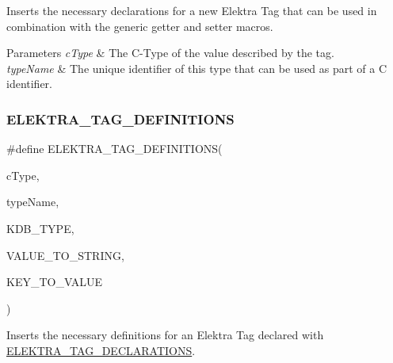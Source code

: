 Inserts the necessary declarations for a new Elektra Tag that can be used in combination with the generic getter and setter macros. 


\begin{DoxyParams}{Parameters}
{\em c\+Type} & The C-\/\+Type of the value described by the tag. \\
\hline
{\em type\+Name} & The unique identifier of this type that can be used as part of a C identifier. \\
\hline
\end{DoxyParams}
\mbox{\label{group__highlevel_ga02481adffa727707a6b0fcf3842b6c95}} 
\subsubsection{\texorpdfstring{E\+L\+E\+K\+T\+R\+A\+\_\+\+T\+A\+G\+\_\+\+D\+E\+F\+I\+N\+I\+T\+I\+O\+NS}{ELEKTRA\_TAG\_DEFINITIONS}}
{\footnotesize\ttfamily \#define E\+L\+E\+K\+T\+R\+A\+\_\+\+T\+A\+G\+\_\+\+D\+E\+F\+I\+N\+I\+T\+I\+O\+NS(\begin{DoxyParamCaption}\item[{}]{c\+Type,  }\item[{}]{type\+Name,  }\item[{}]{K\+D\+B\+\_\+\+T\+Y\+PE,  }\item[{}]{V\+A\+L\+U\+E\+\_\+\+T\+O\+\_\+\+S\+T\+R\+I\+NG,  }\item[{}]{K\+E\+Y\+\_\+\+T\+O\+\_\+\+V\+A\+L\+UE }\end{DoxyParamCaption})}



Inserts the necessary definitions for an Elektra Tag declared with \hyperlink{group__highlevel_gad2b8a6e7493d6128d38d9ac68906fb62}{E\+L\+E\+K\+T\+R\+A\+\_\+\+T\+A\+G\+\_\+\+D\+E\+C\+L\+A\+R\+A\+T\+I\+O\+NS}. 


